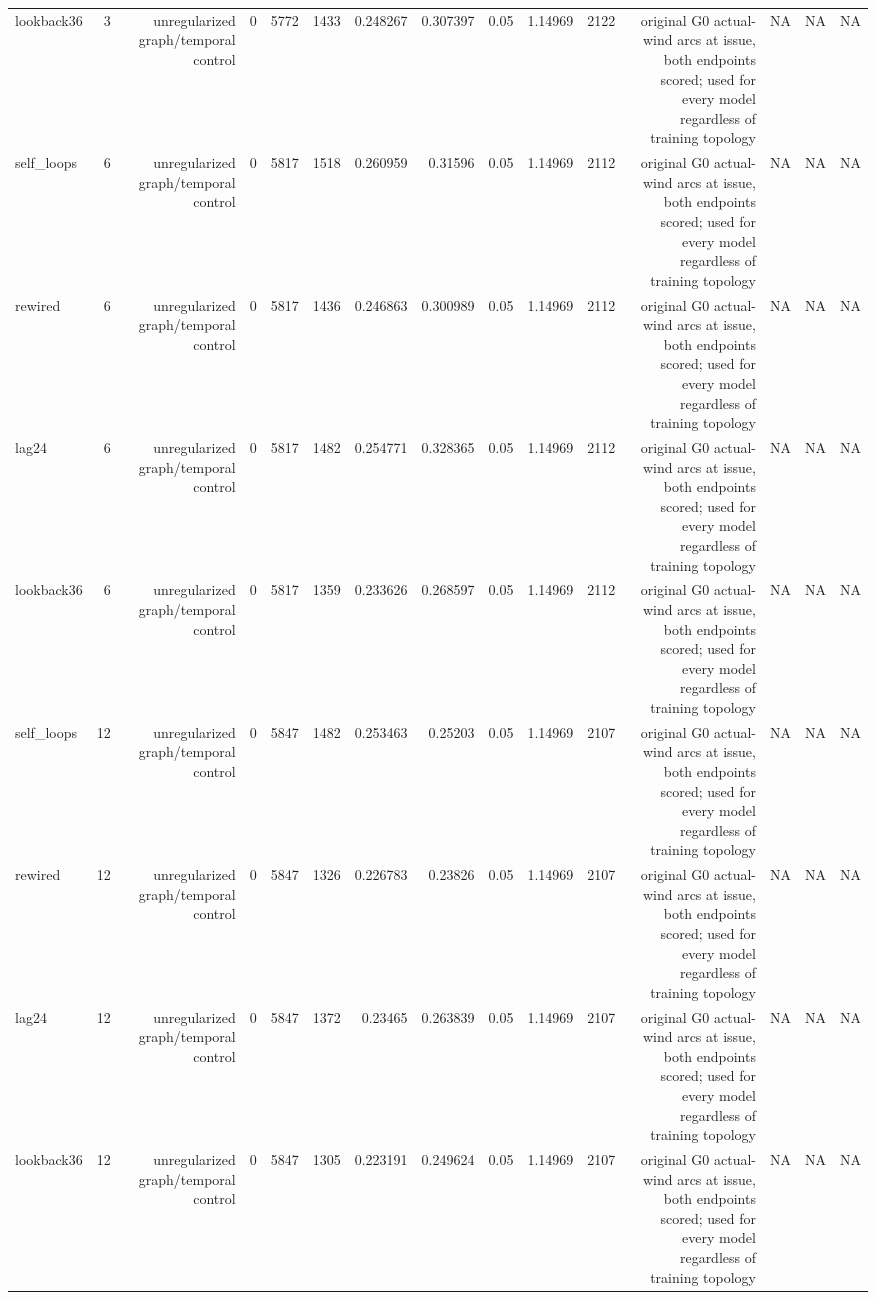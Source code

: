 \begin{tabular}{lrrrrrrrrrrrrrr}
lookback36 & 3 & unregularized graph/temporal control & 0 & 5772 & 1433 & 0.248267 & 0.307397 & 0.05 & 1.14969 & 2122 & original G0 actual-wind arcs at issue, both endpoints scored; used for every model regardless of training topology & NA & NA & NA \\
self\_loops & 6 & unregularized graph/temporal control & 0 & 5817 & 1518 & 0.260959 & 0.31596 & 0.05 & 1.14969 & 2112 & original G0 actual-wind arcs at issue, both endpoints scored; used for every model regardless of training topology & NA & NA & NA \\
rewired & 6 & unregularized graph/temporal control & 0 & 5817 & 1436 & 0.246863 & 0.300989 & 0.05 & 1.14969 & 2112 & original G0 actual-wind arcs at issue, both endpoints scored; used for every model regardless of training topology & NA & NA & NA \\
lag24 & 6 & unregularized graph/temporal control & 0 & 5817 & 1482 & 0.254771 & 0.328365 & 0.05 & 1.14969 & 2112 & original G0 actual-wind arcs at issue, both endpoints scored; used for every model regardless of training topology & NA & NA & NA \\
lookback36 & 6 & unregularized graph/temporal control & 0 & 5817 & 1359 & 0.233626 & 0.268597 & 0.05 & 1.14969 & 2112 & original G0 actual-wind arcs at issue, both endpoints scored; used for every model regardless of training topology & NA & NA & NA \\
self\_loops & 12 & unregularized graph/temporal control & 0 & 5847 & 1482 & 0.253463 & 0.25203 & 0.05 & 1.14969 & 2107 & original G0 actual-wind arcs at issue, both endpoints scored; used for every model regardless of training topology & NA & NA & NA \\
rewired & 12 & unregularized graph/temporal control & 0 & 5847 & 1326 & 0.226783 & 0.23826 & 0.05 & 1.14969 & 2107 & original G0 actual-wind arcs at issue, both endpoints scored; used for every model regardless of training topology & NA & NA & NA \\
lag24 & 12 & unregularized graph/temporal control & 0 & 5847 & 1372 & 0.23465 & 0.263839 & 0.05 & 1.14969 & 2107 & original G0 actual-wind arcs at issue, both endpoints scored; used for every model regardless of training topology & NA & NA & NA \\
lookback36 & 12 & unregularized graph/temporal control & 0 & 5847 & 1305 & 0.223191 & 0.249624 & 0.05 & 1.14969 & 2107 & original G0 actual-wind arcs at issue, both endpoints scored; used for every model regardless of training topology & NA & NA & NA \\

\end{tabular}
